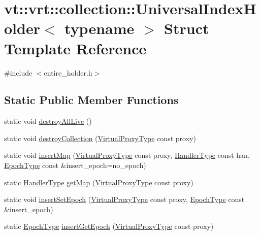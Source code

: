 \hypertarget{structvt_1_1vrt_1_1collection_1_1_universal_index_holder}{}\section{vt\+:\+:vrt\+:\+:collection\+:\+:Universal\+Index\+Holder$<$ typename $>$ Struct Template Reference}
\label{structvt_1_1vrt_1_1collection_1_1_universal_index_holder}


{\ttfamily \#include $<$entire\+\_\+holder.\+h$>$}

\subsection*{Static Public Member Functions}
\begin{DoxyCompactItemize}
\item 
static void \hyperlink{structvt_1_1vrt_1_1collection_1_1_universal_index_holder_a4403caeab7e7cc22ec0bfcf18c212e1e}{destroy\+All\+Live} ()
\item 
static void \hyperlink{structvt_1_1vrt_1_1collection_1_1_universal_index_holder_aca1584759cadbda74eb8c499c73a63e3}{destroy\+Collection} (\hyperlink{namespacevt_a1b417dd5d684f045bb58a0ede70045ac}{Virtual\+Proxy\+Type} const proxy)
\item 
static void \hyperlink{structvt_1_1vrt_1_1collection_1_1_universal_index_holder_a1c22a6f3bff59afb3fc5d86e083a7bdc}{insert\+Map} (\hyperlink{namespacevt_a1b417dd5d684f045bb58a0ede70045ac}{Virtual\+Proxy\+Type} const proxy, \hyperlink{namespacevt_af64846b57dfcaf104da3ef6967917573}{Handler\+Type} const han, \hyperlink{namespacevt_a985a5adf291c34a3ca263b3378388236}{Epoch\+Type} const \&insert\+\_\+epoch=no\+\_\+epoch)
\item 
static \hyperlink{namespacevt_af64846b57dfcaf104da3ef6967917573}{Handler\+Type} \hyperlink{structvt_1_1vrt_1_1collection_1_1_universal_index_holder_aeff5de464c1477e78b8049a7fbec1046}{get\+Map} (\hyperlink{namespacevt_a1b417dd5d684f045bb58a0ede70045ac}{Virtual\+Proxy\+Type} const proxy)
\item 
static void \hyperlink{structvt_1_1vrt_1_1collection_1_1_universal_index_holder_a8193db85d822ff2783925ef2a5ac3b17}{insert\+Set\+Epoch} (\hyperlink{namespacevt_a1b417dd5d684f045bb58a0ede70045ac}{Virtual\+Proxy\+Type} const proxy, \hyperlink{namespacevt_a985a5adf291c34a3ca263b3378388236}{Epoch\+Type} const \&insert\+\_\+epoch)
\item 
static \hyperlink{namespacevt_a985a5adf291c34a3ca263b3378388236}{Epoch\+Type} \hyperlink{structvt_1_1vrt_1_1collection_1_1_universal_index_holder_a45b646ebb0be1787d3893f4e719ed031}{insert\+Get\+Epoch} (\hyperlink{namespacevt_a1b417dd5d684f045bb58a0ede70045ac}{Virtual\+Proxy\+Type} const proxy)
\end{DoxyCompactItemize}
